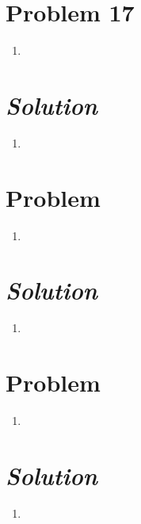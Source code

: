 \documentclass{article}
\begin{document}
\section*{Problem 17} 
\begin{enumerate}[label=\alph*)]
	\item %
\end{enumerate}
\section*{\textit{Solution}} 
\begin{enumerate}[label=\alph*)]
	\item %
\end{enumerate}

\section*{Problem } 
\begin{enumerate}[label=\alph*)]
	\item %
\end{enumerate}
\section*{\textit{Solution}} 
\begin{enumerate}[label=\alph*)]
	\item %
\end{enumerate}

\section*{Problem } 
\begin{enumerate}[label=\alph*)]
	\item %
\end{enumerate}
\section*{\textit{Solution}} 
\begin{enumerate}[label=\alph*)]
	\item %
\end{enumerate}
\end{document}
